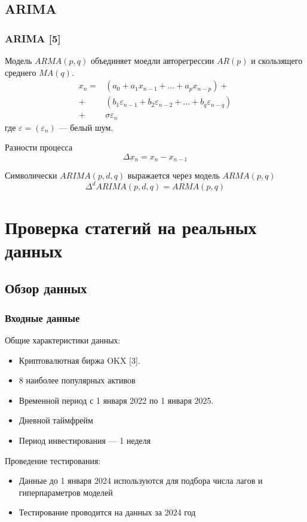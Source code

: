 \documentclass{beamer}
\renewcommand{\epsilon}{\varepsilon}
\begin{document}
\subsection{ARIMA}

\begin{frame}
    \frametitle{ARIMA [5]}
    Модель $ARMA(p, q)$ объединяет моедли авторегрессии $AR(p)$ и скользящего среднего $MA(q)$.
    \begin{align*}
        x_n = & \left(a_0 + a_1 x_{n-1} + \dots + a_p x_{n-p} \right) + \\
	    + & \left(b_1 \epsilon_{n-1} + b_2 \epsilon_{n-2} + \dots + b_q \epsilon_{n - q} \right) \\
        + & \sigma \epsilon_n
    \end{align*}
    где $\epsilon = (\epsilon_n)$ --- белый шум.

    Разности процесса
    \[
        \Delta x_n = x_n - x_{n-1}
    \]

    Символически $ARIMA(p, d, q)$ выражается через модель $ARMA(p, q)$
    \[
        \Delta^d ARIMA(p, d, q) = ARMA(p, q)
    \]
\end{frame}

\section{Проверка статегий на реальных данных}

\subsection{Обзор данных}

\begin{frame}
    \frametitle{Входные данные}
    Общие характеристики данных:
    \begin{itemize}
        \item Криптовалютная биржа OKX [3]. 
        \item 8 наиболее популярных активов
        \item Временной период с 1 января 2022 по 1 января 2025.
        \item Дневной таймфрейм
        \item Период инвестирования --- 1 неделя
    \end{itemize}

    Проведение тестирования:
    \begin{itemize}
        \item Данные до 1 января 2024 используются для подбора числа лагов и 
        гиперпараметров моделей
        \item Тестирование проводится на данных за 2024 год
    \end{itemize}
\end{frame}
\end{document}
